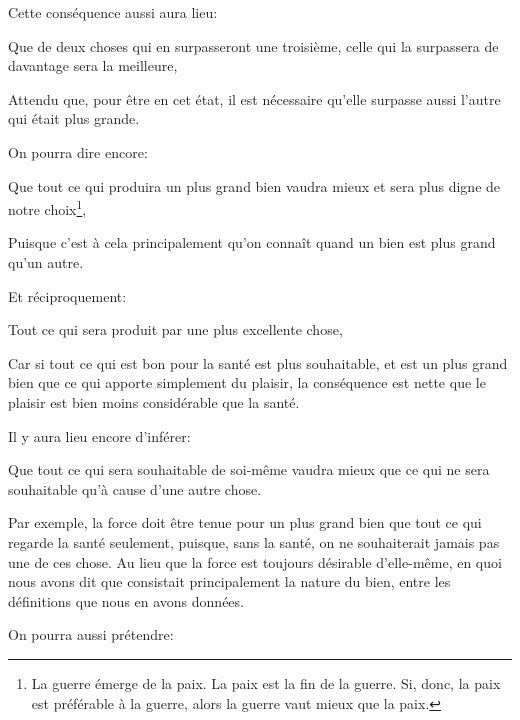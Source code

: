 \bigbreak

Cette conséquence aussi aura lieu:

\begin{lieu}
 Que de deux choses qui en surpasseront une troisième, celle qui la surpassera de davantage sera la
 meilleure,
\end{lieu}

Attendu que, pour être en cet état, il est nécessaire qu'elle surpasse aussi l'autre qui était plus grande.

\bigbreak

On pourra dire encore:

\begin{lieu}
	Que tout ce qui produira un plus grand bien vaudra mieux et sera plus digne de notre choix\footnote{La
	guerre émerge de la paix. La paix est la fin de la guerre. Si, donc, la paix est préférable à la guerre,
	alors la guerre vaut mieux que la paix.},
\end{lieu}
 
Puisque c'est à cela principalement qu'on connaît quand un bien est plus grand qu'un autre.

Et réciproquement:

\begin{lieu}
	Tout ce qui sera produit par une plus excellente chose,
\end{lieu}

Car si tout ce qui est bon pour la santé est plus souhaitable, et est un plus grand bien que ce qui apporte
simplement du plaisir, la conséquence est nette que le plaisir est bien moins considérable que la santé.

\bigbreak

Il y aura lieu encore d'inférer:

\begin{lieu}
	Que tout ce qui sera souhaitable de soi-même vaudra mieux que ce qui ne sera souhaitable qu'à cause d'une
	autre chose.
\end{lieu}
 
Par exemple, la force doit être tenue pour un plus grand bien que tout ce qui regarde la santé seulement, puisque,
sans la santé, on ne souhaiterait jamais pas une de ces chose. Au lieu que la force est toujours désirable d'elle-même,
en quoi nous avons dit que consistait principalement la nature du bien, entre les définitions que nous en avons données.

\bigbreak

On pourra aussi prétendre:

